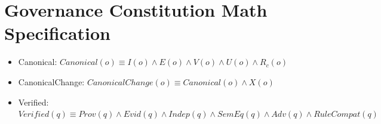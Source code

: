 \documentclass{article}
\begin{document}
\section{Governance Constitution Math Specification}

\begin{itemize}
    \item Canonical: $Canonical(o) \equiv I(o) \wedge E(o) \wedge V(o) \wedge U(o) \wedge R_c(o)$
    \item CanonicalChange: $CanonicalChange(o) \equiv Canonical(o) \wedge X(o)$
\end{itemize}

\begin{itemize}
    \item Verified: $Verified(q) \equiv Prov(q) \wedge Evid(q) \wedge Indep(q) \wedge SemEq(q) \wedge Adv(q) \wedge RuleCompat(q)$
\end{itemize}
\end{document}
